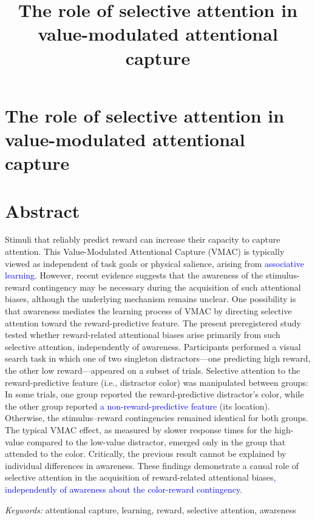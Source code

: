 \documentclass[
  man,
  floatsintext,
  longtable,
  nolmodern,
  notxfonts,
  notimes,
  mask,
  colorlinks=true,linkcolor=blue,citecolor=blue,urlcolor=blue]{apa7}
\title{The role of selective attention in value-modulated attentional
capture}
\begin{document}
\section[Introduction]{The role of selective attention in
value-modulated attentional capture}

\setcounter{secnumdepth}{-\maxdimen} %

\setlength\LTleft{0pt}


\section*{Abstract}

Stimuli that reliably predict reward can increase their capacity to
capture attention. This Value-Modulated Attentional Capture (VMAC) is
typically viewed as independent of task goals or physical salience,
arising from \textcolor{blue}{associative learning}. However, recent
evidence suggests that the awareness of the stimulus-reward contingency
may be necessary during the acquisition of such attentional biases,
although the underlying mechanism remains unclear. One possibility is
that awareness mediates the learning process of VMAC by directing
selective attention toward the reward-predictive feature. The present
preregistered study tested whether reward-related attentional biases
arise primarily from such selective attention, independently of
awareness. Participants performed a visual search task in which one of
two singleton distractors---one predicting high reward, the other low
reward---appeared on a subset of trials. Selective attention to the
reward-predictive feature (i.e., distractor color) was manipulated
between groups: In some trials, one group reported the reward-predictive
distractor's color, while the other group reported \textcolor{blue}{a
non-reward-predictive feature} (its location). Otherwise, the
stimulus--reward contingencies remained identical for both groups. The
typical VMAC effect, as measured by slower response times for the
high-value compared to the low-value distractor, emerged only in the
group that attended to the color. Critically, the previous result cannot
be explained by individual differences in awareness. These findings
demonstrate a causal role of selective attention in the acquisition of
reward-related attentional biases\textcolor{blue}{, independently of
awareness about the color-reward contingency}.

\bigskip

\noindent\textit{Keywords:} attentional capture, learning, reward,
selective attention, awareness
\end{document}
